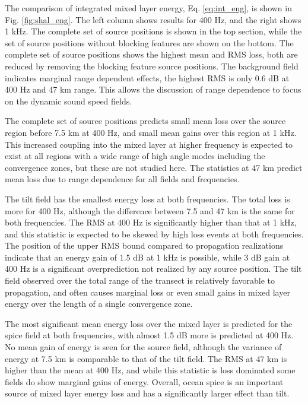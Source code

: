 \documentclass[preprint,NumberedRefs]{JASA}
\begin{document}
The comparison of integrated mixed layer energy, Eq. \eqref{eq:int_eng}, is shown in Fig. \ref{fig:shal_eng}. The left column shows results for 400 Hz, and the right shows 1 kHz. The complete set of source positions is shown in the top section, while the set of source positions without blocking features are shown on the bottom. The complete set of source positions shows the highest mean and RMS loss, both are reduced by removing the blocking feature source positions. The background field indicates marginal range dependent effects, the highest RMS is only 0.6 dB at 400 Hz and 47 km range. This allows the discussion of range dependence to focus on the dynamic sound speed fields.

The complete set of source positions predicts small mean loss over the source region before 7.5 km at 400 Hz, and small mean gains over this region at 1 kHz. This increased coupling into the mixed layer at higher frequency is expected to exist at all regions with a wide range of high angle modes including the convergence zones, but these are not studied here. The statistics at 47 km predict mean loss due to range dependence for all fields and frequencies.

The tilt field has the smallest energy loss at both frequencies. The total loss is more for 400 Hz, although the difference between 7.5 and 47 km is the same for both frequencies. The RMS at 400 Hz is significantly higher than that at 1 kHz, and this statistic is expected to be skewed by high loss events at both frequencies. The position of the upper RMS bound compared to propagation realizations indicate that an energy gain of 1.5 dB at 1 kHz is possible, while 3 dB gain at 400 Hz is a significant overprediction not realized by any source position. The tilt field observed over the total range of the transect is relatively favorable to propagation, and often causes marginal loss or even small gains in mixed layer energy over the length of a single convergence zone.

The most significant mean energy loss over the mixed layer is predicted for the spice field at both frequencies, with almost 1.5 dB more is predicted at 400 Hz. No mean gain of energy is seen for the source field, although the variance of energy at 7.5 km is comparable to that of the tilt field. The RMS at 47 km is higher than the mean at 400 Hz, and while this statistic is loss dominated some fields do show marginal gains of energy. Overall, ocean spice is an important source of mixed layer energy loss and has a significantly larger effect than tilt.
\end{document}
